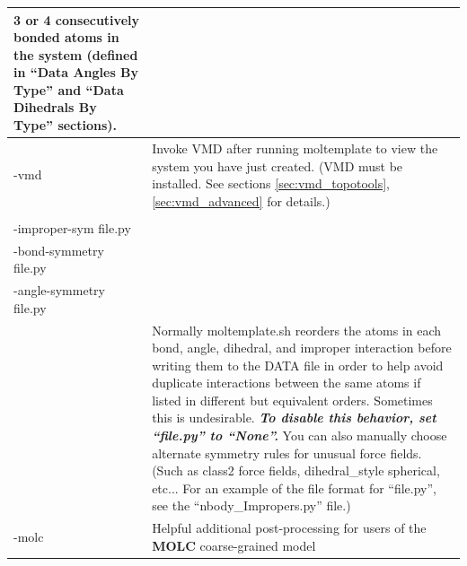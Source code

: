 \documentclass[11pt]{article}
\begin{document}
\begin{longtable}[h]{l|p{10cm}}
3 or 4 consecutively bonded atoms in the system
(defined in ``Data Angles By Type'' and ``Data Dihedrals By Type'' sections).
\\
\hline
-vmd &
Invoke VMD after running moltemplate to view the system you have just created.
(VMD must be installed.  
 See sections \ref{sec:vmd_topotools}, \ref{sec:vmd_advanced} for details.)
\\
\hline
\begin{tabular}[t]{l}
-dihedral-sym file.py
\\
-improper-sym file.py
\\
-bond-symmetry file.py
\\
-angle-symmetry file.py
\\
\end{tabular}
& 
Normally moltemplate.sh reorders the atoms in each bond, angle, dihedral, and improper interaction before writing them to the DATA file in order to help avoid duplicate interactions between the same atoms if listed in different but equivalent orders.  Sometimes this is undesirable.  \textit{\textbf{To disable this behavior, set ``file.py'' to ``None''.}}  You can also manually choose alternate symmetry rules for unusual force fields. (Such as class2 force fields, dihedral\_style spherical, etc...  For an example of the file format for ``file.py'', see the ``nbody\_Impropers.py'' file.)
\\
\hline
-molc &
Helpful additional post-processing for users of the \textbf{MOLC}
coarse-grained model
\\
\hline

\end{longtable}
\end{document}
